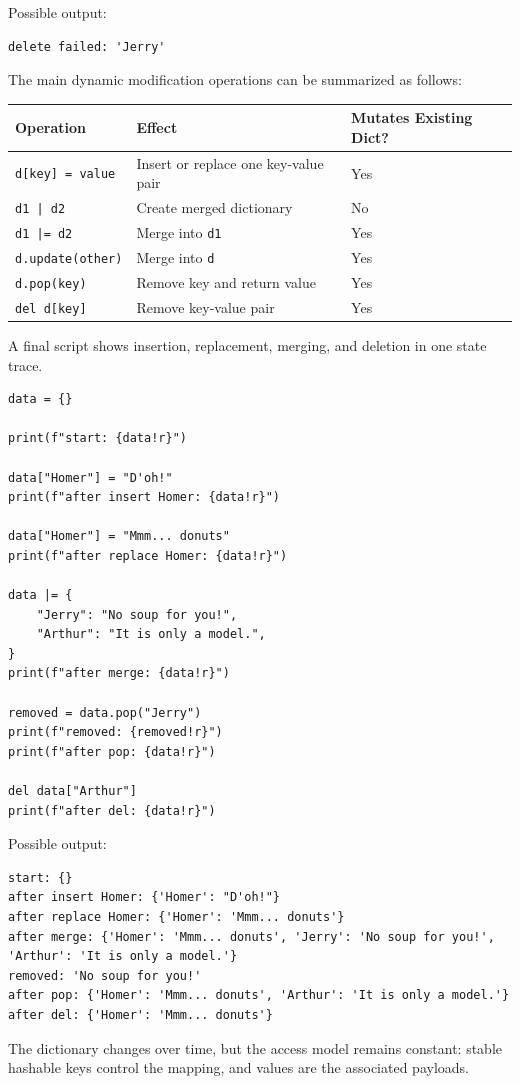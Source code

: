 Possible output:

\begin{verbatim}
delete failed: 'Jerry'
\end{verbatim}

The main dynamic modification operations can be summarized as follows:

\begin{center}
\begin{tabular}{lll}
\textbf{Operation} & \textbf{Effect} & \textbf{Mutates Existing Dict?} \\
\hline
\texttt{d[key] = value} & Insert or replace one key-value pair & Yes \\
\texttt{d1 | d2} & Create merged dictionary & No \\
\texttt{d1 |= d2} & Merge into \texttt{d1} & Yes \\
\texttt{d.update(other)} & Merge into \texttt{d} & Yes \\
\texttt{d.pop(key)} & Remove key and return value & Yes \\
\texttt{del d[key]} & Remove key-value pair & Yes \\
\end{tabular}
\end{center}

A final script shows insertion, replacement, merging, and deletion in one state trace.

\begin{verbatim}
data = {}

print(f"start: {data!r}")

data["Homer"] = "D'oh!"
print(f"after insert Homer: {data!r}")

data["Homer"] = "Mmm... donuts"
print(f"after replace Homer: {data!r}")

data |= {
    "Jerry": "No soup for you!",
    "Arthur": "It is only a model.",
}
print(f"after merge: {data!r}")

removed = data.pop("Jerry")
print(f"removed: {removed!r}")
print(f"after pop: {data!r}")

del data["Arthur"]
print(f"after del: {data!r}")
\end{verbatim}

Possible output:

\begin{verbatim}
start: {}
after insert Homer: {'Homer': "D'oh!"}
after replace Homer: {'Homer': 'Mmm... donuts'}
after merge: {'Homer': 'Mmm... donuts', 'Jerry': 'No soup for you!', 'Arthur': 'It is only a model.'}
removed: 'No soup for you!'
after pop: {'Homer': 'Mmm... donuts', 'Arthur': 'It is only a model.'}
after del: {'Homer': 'Mmm... donuts'}
\end{verbatim}

The dictionary changes over time, but the access model remains constant: stable hashable keys control the mapping, and values are the associated payloads.